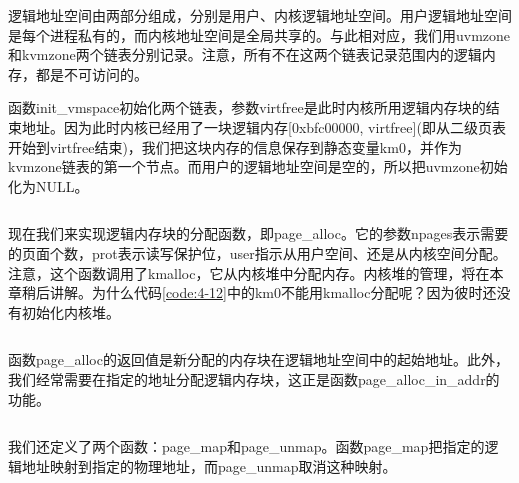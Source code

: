 \documentclass[main.tex]{subfiles}
\begin{document}
\begin{CJK*}{UTF8}{song}
逻辑地址空间由两部分组成，分别是用户、内核逻辑地址空间。用户逻辑地址空间是每个进程私有的，而内核地址空间是全局共享的。与此相对应，我们用uvmzone和kvmzone两个链表分别记录。注意，所有不在这两个链表记录范围内的逻辑内存，都是不可访问的。

\par
函数init\_vmspace初始化两个链表，参数virtfree是此时内核所用逻辑内存块的结束地址。因为此时内核已经用了一块逻辑内存[0xbfc00000, virtfree](即从二级页表开始到virtfree结束)，我们把这块内存的信息保存到静态变量km0，并作为kvmzone链表的第一个节点。而用户的逻辑地址空间是空的，所以把uvmzone初始化为NULL。

\begin{code}
\label{code:4-12}
\inputminted[firstline=38,lastline=47,linenos,numbersep=5pt,frame=lines,framesep=2mm]{c}{src/chapter04/kernel/page.c}
\end{code}

现在我们来实现逻辑内存块的分配函数，即page\_alloc。它的参数npages表示需要的页面个数，prot表示读写保护位，user指示从用户空间、还是从内核空间分配。注意，这个函数调用了kmalloc，它从内核堆中分配内存。内核堆的管理，将在本章稍后讲解。为什么代码\ref{code:4-12}中的km0不能用kmalloc分配呢？因为彼时还没有初始化内核堆。

\begin{code}
\label{code:4-13}
\inputminted[firstline=112,lastline=174,linenos,numbersep=5pt,frame=lines,framesep=2mm]{c}{src/chapter04/kernel/page.c}
\end{code}

\noindent
函数page\_alloc的返回值是新分配的内存块在逻辑地址空间中的起始地址。此外，我们经常需要在指定的地址分配逻辑内存块，这正是函数page\_alloc\_in\_addr的功能。

\begin{code}
\label{code:4-14}
\inputminted[firstline=49,lastline=110,linenos,numbersep=5pt,frame=lines,framesep=2mm]{c}{src/chapter04/kernel/page.c}
\end{code}

我们还定义了两个函数：page\_map和page\_unmap。函数page\_map把指定的逻辑地址映射到指定的物理地址，而page\_unmap取消这种映射。

\begin{code}
\label{code:4-15}
\inputminted[firstline=239,lastline=252,linenos,numbersep=5pt,frame=lines,framesep=2mm]{c}{src/chapter04/kernel/page.c}
\end{code}


\end{CJK*}
\end{document}
